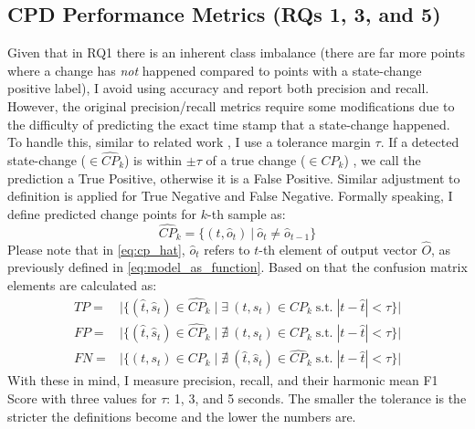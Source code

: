 \subsection{CPD Performance Metrics (RQs 1, 3, and 5)} \label{sec:CPD_metrics}
Given that in RQ1 there is an inherent class imbalance (there are far more points where a change has \textit{not} happened compared to points with a state-change positive label), I avoid using accuracy and report both precision and recall. %
However, the original precision/recall metrics require some modifications due to the difficulty of predicting the exact time stamp that a state-change happened. To handle this, similar to related work \cite{Truong2018ChangePointSurvey}, I use a tolerance margin $\tau$. If a detected state-change ($\in\hat{CP}_k$) is within $\pm\tau$ of a true change ($\in{CP}_k$) , we call the prediction a True Positive, otherwise it is a False Positive. Similar adjustment to definition is applied for True Negative and False Negative. 
Formally speaking, I define predicted change points for $k$-th sample as:
\begin{equation} \label{eq:cp_hat}
\hat{CP}_k = \big\{(t, \hat{o}_t)\: |\: \hat{o}_t \neq \hat{o}_{t-1} \big\}
\end{equation}
Please note that in \eqref{eq:cp_hat}, $\hat{o}_t$ refers to $t$-th element of output vector $\hat{O}$, as previously defined in \eqref{eq:model_as_function}. Based on that the confusion matrix elements are calculated as:
\begin{equation} \label{eq:metrics}
\begin{split}
TP ={}&{}\Big|\big\{ (\hat{t}, \hat{s}_t) \in \hat{CP}_k \;\big|\; \exists\: (t, s_t) \in CP_k \;\text{s.t.}\; |t - \hat{t}| < \tau\big\}\Big| \\
FP ={}&{}\Big|\big\{ (\hat{t}, \hat{s}_t) \in \hat{CP}_k \;\big|\; \nexists\: (t, s_t) \in CP_k \;\text{s.t.}\; |t - \hat{t}| < \tau\big\}\Big| \\
FN ={}&{}\Big|\big\{ (t, s_t) \in CP_k \;\big|\; \nexists\: (\hat{t}, \hat{s}_t) \in \hat{CP}_k \;\text{s.t.}\; |t - \hat{t}| < \tau\big\}\Big| 
\end{split}
\end{equation}
With these in mind, I measure precision, recall, and their harmonic mean F1 Score with three values for $\tau$: 1, 3, and 5 seconds. The smaller the tolerance is the stricter the definitions become and the lower the numbers are. 

